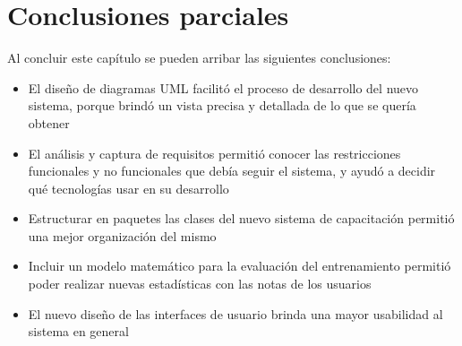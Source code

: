 \section{Conclusiones parciales}
Al concluir este capítulo se pueden arribar las siguientes conclusiones:
\begin{itemize}
\item El diseño de diagramas UML facilitó el proceso de desarrollo del nuevo sistema, porque brindó un vista precisa y detallada de lo que se quería obtener
\item El análisis y captura de requisitos permitió conocer las restricciones funcionales y no funcionales que debía seguir el sistema, y ayudó a decidir qué tecnologías usar en su desarrollo
\item Estructurar en paquetes las clases del nuevo sistema de capacitación permitió una mejor organización del mismo
\item Incluir un modelo matemático para la evaluación del entrenamiento permitió poder realizar nuevas estadísticas con las notas de los usuarios
\item El nuevo diseño de las interfaces de usuario brinda una mayor usabilidad al sistema en general
\end{itemize}
